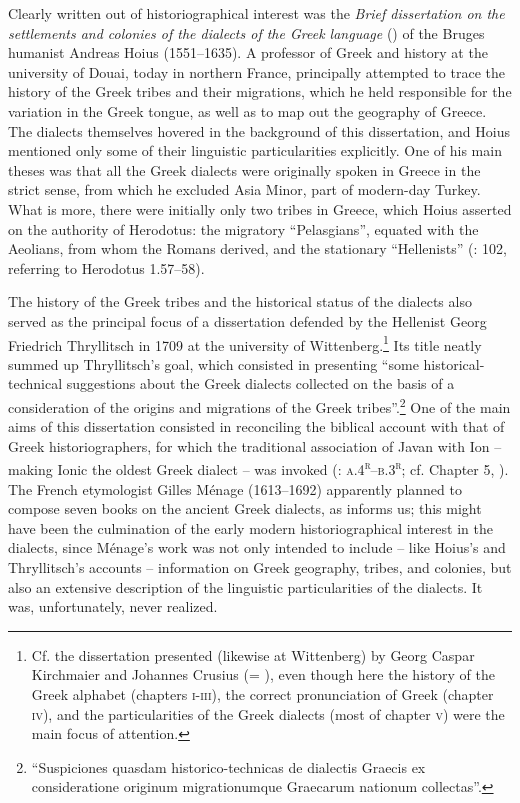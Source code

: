 Clearly written out of historiographical interest was the \textit{Brief dissertation on the settlements and colonies of the dialects of the Greek language} (\citeyear{Hoius1620}) of the Bruges humanist Andreas Hoius (1551–1635). A professor of Greek and history at the university of Douai, today in northern France, \citet[95]{Hoius1620} principally attempted to trace the history of the Greek tribes and their migrations, which he held responsible for the variation in the Greek tongue, as well as to map out the geography of Greece. The dialects themselves hovered in the background of this dissertation, and Hoius mentioned only some of their linguistic particularities explicitly. One of his main theses was that all the Greek dialects were originally spoken in Greece in the strict sense, from which he excluded Asia Minor, part of modern-day Turkey.\textsuperscript{} What is more, there were initially only two tribes in Greece, which Hoius asserted on the authority of Herodotus: the migratory “Pelasgians”, equated with the Aeolians, from whom the Romans derived, and the stationary “Hellenists” (\citealt{Hoius1620}: 102, referring to Herodotus 1.57–58).

The history of the Greek tribes and the historical status of the dialects also served as the principal focus of a dissertation defended by the Hellenist Georg Friedrich Thryllitsch in 1709 at the university of Wittenberg.\footnote{Cf. the dissertation presented (likewise at Wittenberg) by Georg Caspar Kirchmaier and Johannes Crusius (= \citealt{KirchmaierCrusius1684}), even though here the history of the Greek alphabet (chapters \textsc{i}{}-\textsc{iii}), the correct pronunciation of Greek (chapter \textsc{iv}), and the particularities of the Greek dialects (most of chapter \textsc{v}) were the main focus of attention.} Its title neatly summed up Thryllitsch’s goal, which consisted in presenting “some historical-technical suggestions about the Greek dialects collected on the basis of a consideration of the origins and migrations of the Greek tribes”.\footnote{“Suspiciones quasdam historico-technicas de dialectis Graecis ex consideratione originum migrationumque Graecarum nationum collectas”.} One of the main aims of this dissertation consisted in reconciling the biblical account with that of Greek historiographers, for which the traditional association of Javan with Ion – making Ionic the oldest Greek dialect – was invoked (\citealt{Thryllitsch1709}: \textsc{a.4}\textsc{\textsuperscript{r}}\textsc{–b.3}\textsc{\textsuperscript{r}}; cf. Chapter 5, ). The French etymologist Gilles Ménage (1613–1692) apparently planned to compose seven books on the ancient Greek dialects, as \citet[252]{Leibniz1991} informs us; this might have been the culmination of the early modern historiographical interest in the dialects, since Ménage’s work was not only intended to include – like Hoius’s and Thryllitsch’s accounts – information on Greek geography, tribes, and colonies, but also an extensive description of the linguistic particularities of the dialects. It was, unfortunately, never realized.

